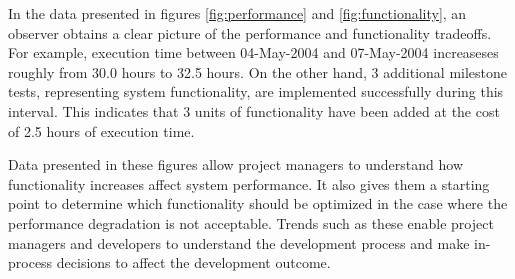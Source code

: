 In the data presented in figures \ref{fig:performance} and
\ref{fig:functionality}, an observer obtains a clear picture of the
performance and functionality tradeoffs.  For example, execution time
between 04-May-2004 and 07-May-2004 increaseses roughly from 30.0
hours to 32.5 hours.  On the other hand, 3 additional milestone tests,
representing system functionality, are implemented successfully during
this interval.  This indicates that 3 units of functionality have been
added at the cost of 2.5 hours of execution time.

Data presented in these figures allow project managers to understand
how functionality increases affect system performance.  It also gives
them a starting point to determine which functionality should be
optimized in the case where the performance degradation is not
acceptable.  Trends such as these enable project managers and
developers to understand the development process and make in-process
decisions to affect the development outcome.
